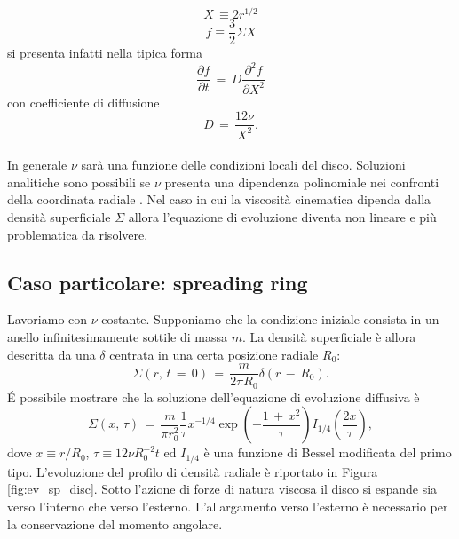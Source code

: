\begin{equation}
X\,\equiv 2r^{1/2}
\label{eq:var_x_ch}
\end{equation}
\begin{equation}
f \equiv \frac{3}{2} \Sigma X
\label{eq:var_y_ch}
\end{equation}
si presenta infatti nella tipica forma
\begin{equation}
\frac{\partial f}{\partial t}\,=\,D\frac{\partial^2 f}{\partial X^2}
\label{eq:diff_ev}
\end{equation}
con coefficiente di diffusione
\begin{equation}
D\,=\,\frac{12\nu}{X^2}.
\label{eq:diff_coeff}
\end{equation}\\
In generale $\nu$ sarà una funzione delle condizioni locali del disco.
Soluzioni analitiche sono possibili se $\nu$ presenta una dipendenza polinomiale nei confronti della coordinata radiale \parencite{BellPringle1974}.
Nel caso in cui la viscosità cinematica dipenda dalla densità superficiale $\Sigma$ allora l'equazione di evoluzione diventa non lineare e più problematica da risolvere.

\subsection{Caso particolare: spreading ring}\label{sec:spreading-ring}

Lavoriamo con $\nu$ costante. Supponiamo che la condizione iniziale consista in un anello infinitesimamente sottile di massa $m$. La densità superficiale è allora descritta da una $\delta$ centrata in una certa posizione radiale $R_0$:
\begin{equation}
\Sigma\left(r,\,t\,=\,0\right)\,=\,\frac{m}{2\pi R_0}\delta\left(r\,-\,R_0\right).
\label{eq:condin_sp_ring}
\end{equation}
\'E possibile mostrare \parencite{BellPringle1974} che la soluzione dell'equazione di evoluzione diffusiva è
\begin{equation}
\Sigma\left(x,\,\tau\right)\,=\,\frac{m}{\pi r_0^2} \frac{1}{\tau} x^{-1/4}\exp{\left(-\frac{1\,+\,x^2}{\tau}\right)}I_{1/4}\left(\frac{2x}{\tau}\right),
\label{eq:sol_sp_ring}
\end{equation}
dove $x \equiv r/R_0$, $\tau \equiv 12\nu R_0^{-2}t$ ed $I_{1/4}$ è una funzione di Bessel modificata del primo tipo. L'evoluzione del profilo di densità radiale è riportato in Figura \ref{fig:ev_sp_disc}. 
Sotto l'azione di forze di natura viscosa il disco si espande sia verso l'interno che verso l'esterno. L'allargamento verso l'esterno è necessario per la conservazione del momento angolare.

